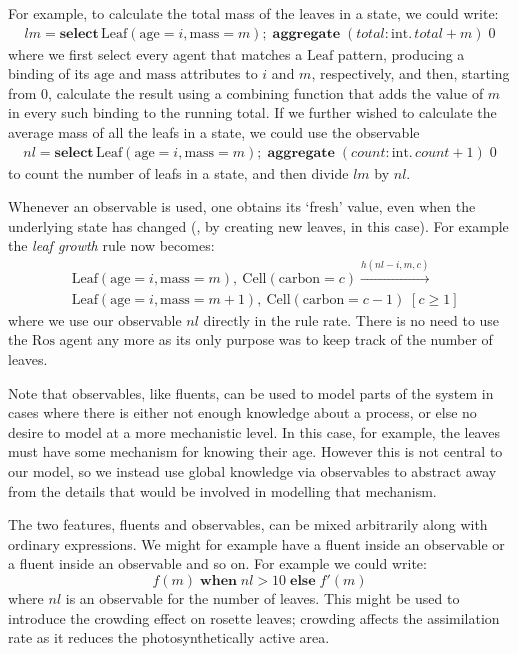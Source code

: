 For example, to calculate the total mass  of the leaves in a state, we could write:
 \begin{align*}
lm = \mathbf{select} \, \mathrm{Leaf}(\mathrm{age} = i, \mathrm{mass} = m) \mathbf{;} \; \mathbf{aggregate} \;
 (total: \mathrm{int}.\, total + m) \; 0
\end{align*}
%
where we first select every agent that matches a $\mathrm{Leaf}$ pattern,
producing a binding of its $\mathrm{age}$ and $\mathrm{mass}$ attributes to $i$
and $m$, respectively, and then, starting from $0$, calculate the result using a
combining function that adds the value of $m$ in every such binding to the
running total.
If we further wished to calculate the average mass of all the leafs in a state,
we could use the observable
\begin{align*}
nl = \mathbf{select} \, \mathrm{Leaf}(\mathrm{age} = i, \mathrm{mass} = m) \mathbf{;} \; \mathbf{aggregate} \;
 (count: \mathrm{int}.\, count + 1) \; 0
\end{align*}
%
to count the number of leafs in a state, and then divide $lm$ by $nl$.

Whenever an observable is used, one obtains its `fresh' value, even when the
underlying state has changed (\eg, by creating new leaves, in this case). For
example the \textit{leaf growth} rule now becomes:
%
\begin{align*}
&\mathrm{Leaf}(\mathrm{age} \!= \!i, \mathrm{mass} \!= \!m),\:
  \mathrm{Cell}(\mathrm{carbon} \!= \!c) \xrightarrow{h(nl-i, m, c)}\:   \\
  &
 \mathrm{Leaf}(\mathrm{age} \!= \!i, \mathrm{mass} \!= \!m+1),\:
    \mathrm{Cell}(\mathrm{carbon} \!= \!c-1) \; [c \geq  1]
\end{align*}
where we use our observable $nl$ directly in the rule rate. There is no need to
use the $\mathrm{Ros}$ agent any more as its only purpose was to keep track of
the number of leaves.

Note that observables, like fluents, can be used to model parts of the system in
cases where there is either not enough knowledge about a process, or else no
desire to model at a more mechanistic level. In this case, for example, the
leaves must have some mechanism for knowing their age. However this is not
central to our model, so we instead use global knowledge via observables to
abstract away from the details that would be involved in modelling that
mechanism.

The two features, fluents and observables, can be mixed arbitrarily along with
ordinary expressions. We might for example have a fluent inside an observable or
a fluent inside an observable and so on. For example we could write:
\begin{equation*}
f(m) \; \mathbf{when} \; nl > 10 \; \mathbf{else} \; f'(m)
\end{equation*}
where $nl$ is an observable for the number of leaves. This might be used to
introduce the crowding effect on rosette leaves; crowding affects the
assimilation rate as it reduces the photosynthetically active area.

